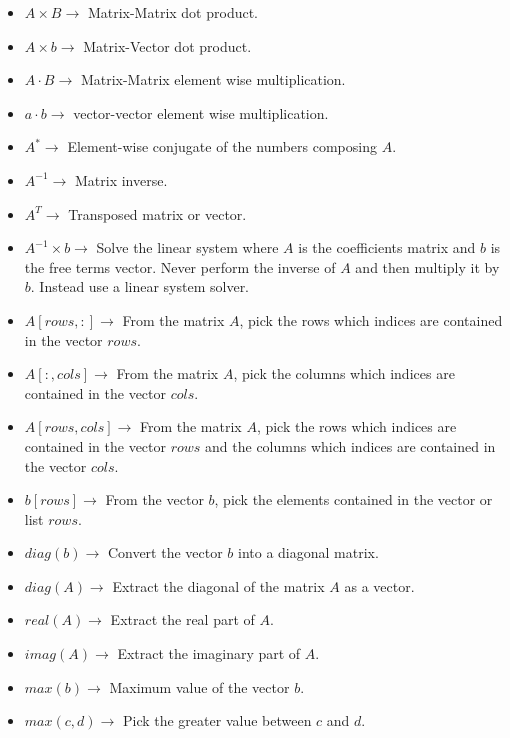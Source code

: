 \documentclass{tufte-book}
\begin{document}
\begin{itemize}

\item $A \times B \rightarrow$ Matrix-Matrix dot product.

\item $A \times b \rightarrow$ Matrix-Vector dot product.

\item $A \cdot B \rightarrow$ Matrix-Matrix element wise multiplication.

\item $a \cdot b \rightarrow$ vector-vector element wise multiplication.

\item $A^{*}\rightarrow$ Element-wise conjugate of the numbers composing $A$.

\item $A^{-1}\rightarrow$ Matrix inverse.

\item $A^{T}\rightarrow$ Transposed matrix or vector.

\item $A^{-1} \times b \rightarrow$ Solve the linear system where $A$ is the coefficients matrix and $b$ is the free terms vector. Never perform the inverse of $A$ and then multiply it by $b$. Instead use a linear system solver.

\item $A[rows, :] \rightarrow$ From the matrix $A$, pick the rows which indices are contained in the vector $rows$.


\item $A[:, cols] \rightarrow$ From the matrix $A$, pick the columns which indices are contained in the vector  $cols$.


\item $A[rows, cols] \rightarrow$ From the matrix $A$, pick the rows which indices are contained in the vector  $rows$ and the columns which indices are contained in the vector  $cols$.


\item $b[rows] \rightarrow$ From the vector $b$, pick the elements contained in the vector or list $rows$.

\item $diag(b) \rightarrow$ Convert the vector $b$ into a diagonal matrix. 

\item $diag(A) \rightarrow$ Extract the diagonal of the matrix $A$ as a vector. 

\item $real(A) \rightarrow$ Extract the real part of $A$.

\item $imag(A) \rightarrow$ Extract the imaginary part of $A$.

\item $max(b) \rightarrow$ Maximum value of the vector $b$.

\item $max(c, d) \rightarrow$ Pick the greater value between $c$ and $d$.
\end{itemize}
\end{document}
